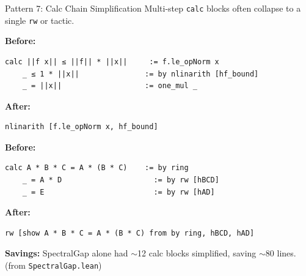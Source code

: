\documentclass[aspectratio=169,10pt]{beamer}
\begin{document}
\begin{frame}[fragile,shrink=5]{Pattern 7: Calc Chain Simplification}
    \vspace{-0.3em}
    Multi-step \texttt{calc} blocks often collapse to a single \texttt{rw} or tactic.

    \vspace{0.2em}
    \textbf{\textcolor{softred}{Before:}}
    \begin{lstlisting}[basicstyle=\ttfamily\fontsize{6pt}{7.5pt}\selectfont\color{white}]
  calc ||f x|| ≤ ||f|| * ||x||     := f.le_opNorm x
    _ ≤ 1 * ||x||               := by nlinarith [hf_bound]
    _ = ||x||                   := one_mul _
    \end{lstlisting}

    \textbf{\textcolor{leangreen}{After:}}
    \begin{lstlisting}[basicstyle=\ttfamily\fontsize{6pt}{7.5pt}\selectfont\color{white}]
  nlinarith [f.le_opNorm x, hf_bound]
    \end{lstlisting}

    \vspace{0.15em}
    \textbf{\textcolor{softred}{Before:}}
    \begin{lstlisting}[basicstyle=\ttfamily\fontsize{6pt}{7.5pt}\selectfont\color{white}]
  calc A * B * C = A * (B * C)    := by ring
    _ = A * D                     := by rw [hBCD]
    _ = E                         := by rw [hAD]
    \end{lstlisting}

    \textbf{\textcolor{leangreen}{After:}}
    \begin{lstlisting}[basicstyle=\ttfamily\fontsize{6pt}{7.5pt}\selectfont\color{white}]
  rw [show A * B * C = A * (B * C) from by ring, hBCD, hAD]
    \end{lstlisting}

    {\small \textbf{Savings:} SpectralGap alone had ${\sim}$12 calc blocks simplified, saving ${\sim}$80 lines.
    {\tiny (from \texttt{SpectralGap.lean})}}
\end{frame}
\end{document}
